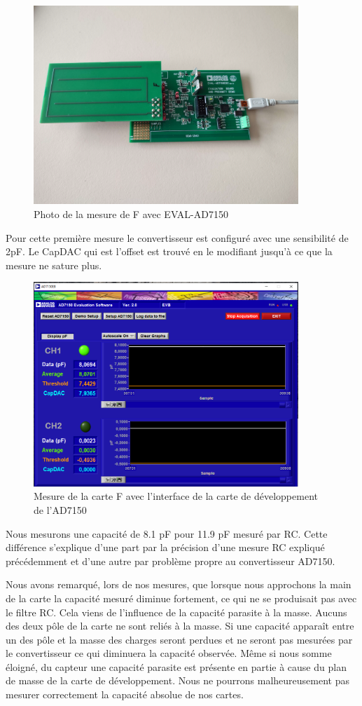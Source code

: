 \begin{figure}[!ht]
\centering
 \includegraphics[width=10cm]{ADPhoto.jpg}
 \caption{Photo de la mesure de F avec EVAL-AD7150}
\end{figure}

\newpage

Pour cette première mesure le convertisseur est configuré avec une sensibilité de 2pF. Le CapDAC qui est l'offset est trouvé en le modifiant jusqu'à ce que la mesure ne sature plus. 

\begin{figure}[!ht]
\centering
 \includegraphics[width=10cm]{Fadair.png}
 \caption{Mesure de la carte F avec l'interface de la carte de développement de l'AD7150  }
\end{figure}

Nous mesurons une capacité de 8.1 pF pour 11.9 pF mesuré par RC. Cette différence s'explique d'une part par la précision d'une mesure RC expliqué précédemment et d'une autre par problème propre au convertisseur AD7150. 

Nous avons remarqué, lors de nos mesures, que lorsque nous approchons la main de la carte la capacité mesuré diminue fortement, ce qui ne se produisait pas avec le filtre RC. Cela viens de l’influence de la capacité parasite à la masse. Aucuns des deux pôle de la carte ne sont reliés à la masse. Si une capacité apparaît entre un des pôle et la masse des charges seront perdues et ne seront pas mesurées par le convertisseur ce qui diminuera la capacité observée. Même si nous somme éloigné, du capteur une capacité parasite est présente en partie à cause du plan de masse de la carte de développement. Nous ne pourrons malheureusement pas mesurer correctement la capacité absolue de nos cartes. 

